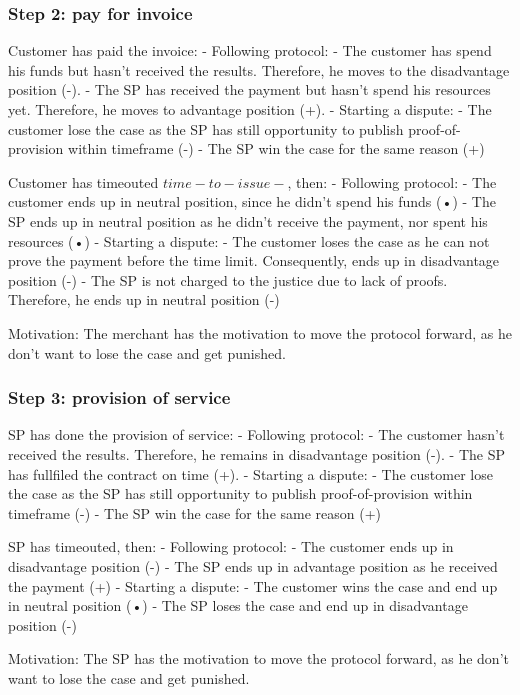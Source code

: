 \documentclass{article}
\begin{document}
\subsubsection{Step 2: pay for invoice}
Customer has paid the invoice:
- Following protocol:
	- The customer has spend his funds but hasn't received the results. Therefore, he moves to the disadvantage position (-).
	- The SP has received the payment but hasn't spend his resources yet. Therefore, he moves to advantage position (+).
- Starting a dispute:
	- The customer lose the case as the SP has still opportunity to publish proof-of-provision within timeframe (-)
	- The SP win the case for the same reason (+)

Customer has timeouted $time-to-issue-$, then:
- Following protocol:
	- The customer ends up in neutral position, since he didn't spend his funds (•)
	- The SP ends up in neutral position as he didn't receive the payment, nor spent his resources (•)
- Starting a dispute:
	- The customer loses the case as he can not prove the payment before the time limit. Consequently, ends up in disadvantage position (-)
	- The SP is not charged to the justice due to lack of proofs. Therefore, he ends up in neutral position (-)


Motivation:
The merchant has the motivation to move the protocol forward, as he don't want to lose the case and get punished.

\subsubsection{Step 3: provision of service}

SP has done the provision of service:
- Following protocol:
	- The customer hasn't received the results. Therefore, he remains in disadvantage position (-).
	- The SP has fullfiled the contract on time (+).
- Starting a dispute:
	- The customer lose the case as the SP has still opportunity to publish proof-of-provision within timeframe (-)
	- The SP win the case for the same reason (+)

SP has timeouted, then:
- Following protocol:
	- The customer ends up in disadvantage position (-)
	- The SP ends up in advantage position as he received the payment (+)
- Starting a dispute:
	- The customer wins the case and end up in neutral position (•)
	- The SP loses the case and end up in disadvantage position (-)


Motivation:
The SP has the motivation to move the protocol forward, as he don't want to lose the case and get punished.
\end{document}
